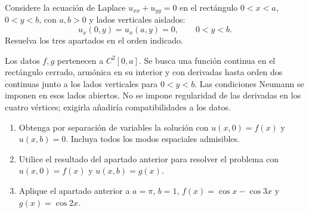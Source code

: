 Considere la ecuación de Laplace $u_{xx}+u_{yy}=0$ en el rectángulo
$0<x<a$, $0<y<b$, con $a,b>0$ y lados verticales aislados:
\[
u_x(0,y)=u_x(a,y)=0,\qquad 0<y<b.
\]
Resuelva los tres apartados en el orden indicado.

Los datos $f,g$ pertenecen a $C^2[0,a]$. Se busca una función continua
en el rectángulo cerrado, armónica en su interior y con derivadas hasta
orden dos continuas junto a los lados verticales para $0<y<b$.
Las condiciones Neumann se imponen en esos lados abiertos. No se impone
regularidad de las derivadas en los cuatro vértices; exigirla añadiría
compatibilidades a los datos.

\begin{enumerate}[label=(\alph*),ref=\alph*,leftmargin=*]
\item Obtenga por separación de variables la solución con $u(x,0)=f(x)$ y
$u(x,b)=0$. Incluya todos los modos espaciales admisibles.
\item Utilice el resultado del apartado anterior para resolver el problema con
$u(x,0)=f(x)$ y $u(x,b)=g(x)$.
\item Aplique el apartado anterior a $a=\pi$, $b=1$,
$f(x)=\cos x-\cos3x$ y $g(x)=\cos2x$.
\end{enumerate}
